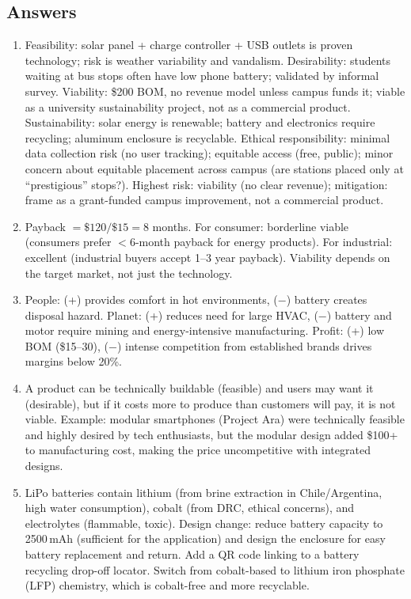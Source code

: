 \subsection{Answers}
\begin{enumerate}[leftmargin=1.5em]
\item Feasibility: solar panel + charge controller + USB outlets is proven technology; risk is weather variability and vandalism. Desirability: students waiting at bus stops often have low phone battery; validated by informal survey. Viability: \$200 BOM, no revenue model unless campus funds it; viable as a university sustainability project, not as a commercial product. Sustainability: solar energy is renewable; battery and electronics require recycling; aluminum enclosure is recyclable. Ethical responsibility: minimal data collection risk (no user tracking); equitable access (free, public); minor concern about equitable placement across campus (are stations placed only at ``prestigious'' stops?). Highest risk: viability (no clear revenue); mitigation: frame as a grant-funded campus improvement, not a commercial product.
\item Payback $= \$120/\$15 = 8$ months. For consumer: borderline viable (consumers prefer $<$6-month payback for energy products). For industrial: excellent (industrial buyers accept 1--3 year payback). Viability depends on the target market, not just the technology.
\item People: (+) provides comfort in hot environments, ($-$) battery creates disposal hazard. Planet: (+) reduces need for large HVAC, ($-$) battery and motor require mining and energy-intensive manufacturing. Profit: (+) low BOM (\$15--30), ($-$) intense competition from established brands drives margins below 20\%.
\item A product can be technically buildable (feasible) and users may want it (desirable), but if it costs more to produce than customers will pay, it is not viable. Example: modular smartphones (Project Ara) were technically feasible and highly desired by tech enthusiasts, but the modular design added \$100+ to manufacturing cost, making the price uncompetitive with integrated designs.
\item LiPo batteries contain lithium (from brine extraction in Chile/Argentina, high water consumption), cobalt (from DRC, ethical concerns), and electrolytes (flammable, toxic). Design change: reduce battery capacity to 2500\,mAh (sufficient for the application) and design the enclosure for easy battery replacement and return. Add a QR code linking to a battery recycling drop-off locator. Switch from cobalt-based to lithium iron phosphate (LFP) chemistry, which is cobalt-free and more recyclable.

\end{enumerate}
